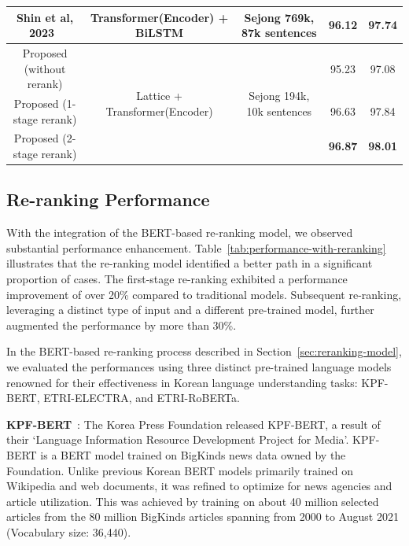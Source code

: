 \documentclass[AMS,STIX2COL]{WileyNJD-v2}
\begin{document}
\begin{table}[]
\begin{tabular*}{500pt}{@{\extracolsep\fill}ccc|cc@{\extracolsep\fill}}
            Shin et al, 2023~\cite{ShinHJ2023}    & Transformer(Encoder) + BiLSTM                   & Sejong 769k, 87k sentences                  & 96.12                      & 97.74                        \\
            \midrule
            Proposed (without rerank)             & \multirow{3}{*}{Lattice + Transformer(Encoder)} & \multirow{3}{*}{Sejong 194k, 10k sentences} & 95.23                      & 97.08                        \\
            Proposed (1-stage rerank)             & ~                                               & ~                                           & 96.63                      & 97.84                        \\
            Proposed (2-stage rerank)             & ~                                               & ~                                           & \textbf{96.87}             & \textbf{98.01}               \\
            \bottomrule
        \end{tabular*}
    \end{table}

    \subsection{Re-ranking Performance}\label{subsec:reranking-performance}

    With the integration of the BERT-based re-ranking model, we observed substantial performance enhancement.
    Table~\ref{tab:performance-with-reranking} illustrates that the re-ranking model identified a better path in a significant proportion of cases.
    The first-stage re-ranking exhibited a performance improvement of over 20\% compared to traditional models.
    Subsequent re-ranking, leveraging a distinct type of input and a different pre-trained model, further augmented the performance by more than 30\%.

    In the BERT-based re-ranking process described in Section~\ref{sec:reranking-model}, we evaluated the performances using three distinct pre-trained language models renowned for their effectiveness in Korean language understanding tasks: KPF-BERT, ETRI-ELECTRA, and ETRI-RoBERTa.

    \textbf{KPF-BERT}~\cite{KPF_BERT}: The Korea Press Foundation released KPF-BERT, a result of their `Language Information Resource Development Project for Media'.
    KPF-BERT is a BERT model trained on BigKinds news data owned by the Foundation.
    Unlike previous Korean BERT models primarily trained on Wikipedia and web documents, it was refined to optimize for news agencies and article utilization.
    This was achieved by training on about 40 million selected articles from the 80 million BigKinds articles spanning from 2000 to August 2021 (Vocabulary size: 36,440).
\end{document}
